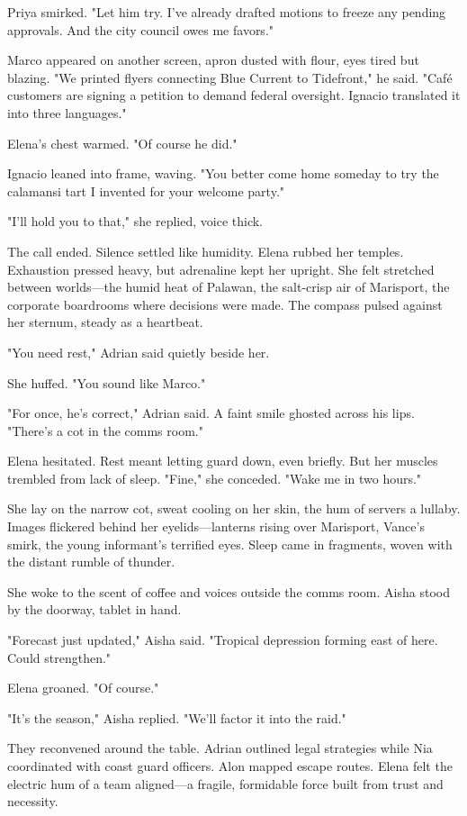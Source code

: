 Priya smirked. "Let him try. I've already drafted motions to freeze any pending approvals. And the city council owes me favors."

Marco appeared on another screen, apron dusted with flour, eyes tired but blazing. "We printed flyers connecting Blue Current to Tidefront," he said. "Café customers are signing a petition to demand federal oversight. Ignacio translated it into three languages."

Elena's chest warmed. "Of course he did."

Ignacio leaned into frame, waving. "You better come home someday to try the calamansi tart I invented for your welcome party."

"I'll hold you to that," she replied, voice thick.

The call ended. Silence settled like humidity. Elena rubbed her temples. Exhaustion pressed heavy, but adrenaline kept her upright. She felt stretched between worlds—the humid heat of Palawan, the salt-crisp air of Marisport, the corporate boardrooms where decisions were made. The compass pulsed against her sternum, steady as a heartbeat.

"You need rest," Adrian said quietly beside her.

She huffed. "You sound like Marco."

"For once, he's correct," Adrian said. A faint smile ghosted across his lips. "There's a cot in the comms room."

Elena hesitated. Rest meant letting guard down, even briefly. But her muscles trembled from lack of sleep. "Fine," she conceded. "Wake me in two hours."

She lay on the narrow cot, sweat cooling on her skin, the hum of servers a lullaby. Images flickered behind her eyelids—lanterns rising over Marisport, Vance's smirk, the young informant's terrified eyes. Sleep came in fragments, woven with the distant rumble of thunder.

\bigskip

She woke to the scent of coffee and voices outside the comms room. Aisha stood by the doorway, tablet in hand.

"Forecast just updated," Aisha said. "Tropical depression forming east of here. Could strengthen."

Elena groaned. "Of course."

"It's the season," Aisha replied. "We'll factor it into the raid."

They reconvened around the table. Adrian outlined legal strategies while Nia coordinated with coast guard officers. Alon mapped escape routes. Elena felt the electric hum of a team aligned—a fragile, formidable force built from trust and necessity.

